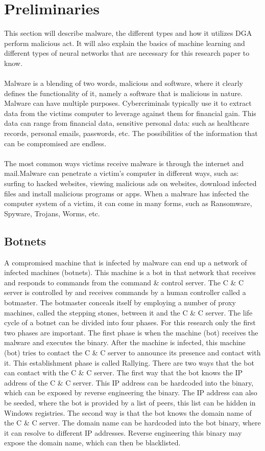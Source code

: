 \chapter{Preliminaries}\label{preliminaries}
This section will describe malware, the different types and how it utilizes DGA perform malicious act. It will also explain the basics of machine learning and different types of neural networks that are necessary for this research paper to know. \\\\  
Malware is a blending of two words, malicious and software, where it clearly defines the functionality of it, namely a software that is malicious in nature. Malware can have multiple purposes. Cybercriminals typically use it to extract data from the victims computer to leverage against them for financial gain. This data can range from financial data, sensitive personal data: such as healthcare records, personal emails, passwords, etc. The possibilities of the information that can be compromised are endless.\\\\ 
The most common ways victims receive malware is through the internet and mail.Malware can penetrate a victim's computer in different ways, such as: surfing to hacked websites, viewing malicious ads on websites, download infected files and install malicious programs or apps. When a malware has infected the computer system of a victim, it can come in many forms, such as Ransomware, Spyware, Trojans, Worms, etc.

\section{Botnets}
A compromised machine that is infected by malware can end up a network of infected machines (botnets). This machine is a bot in that network that receives and responds to commands from the command \& control server. The C \& C server is controlled by and receives commands by a human controller called a botmaster. The botmaster conceals itself by employing
a number of proxy machines, called the stepping stones, between it and the C \& C server. The life cycle of a botnet can be divided into four phases. For this research only the first two phases are important. The first phase is when the machine (bot) receives the malware and executes the binary.
After the machine is infected, this machine (bot) tries to contact the C \& C server to announce its presence and contact with it. This establishment phase is called Rallying. There are two ways that the bot can contact with the C \& C server. The first way that the bot knows the IP address of the C \& C server. This IP address can be hardcoded into the binary, which can be exposed by reverse engineering the binary. The IP address can also be seeded, where the bot is provided by a list of peers, this list can be hidden in Windows registries.  The second way is that the bot knows the domain name of the C \& C server.  The domain name can be hardcoded into the bot binary, where it can resolve to different IP addresses.  Reverse engineering this binary may expose
the domain name, which can then be blacklisted.

